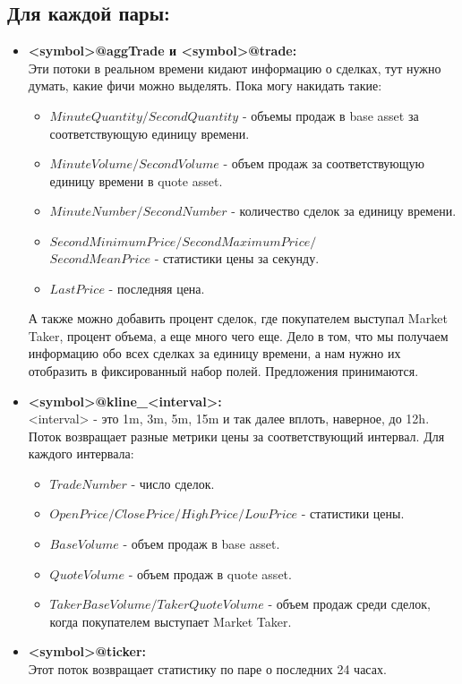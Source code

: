 \documentclass[a4paper,12pt]{article}
\begin{document}
\subsection*{Для каждой пары:}
\begin{itemize}
	\item \textbf{<symbol>@aggTrade и <symbol>@trade:} \\
	Эти потоки в реальном времени кидают информацию о сделках, тут нужно думать, какие фичи можно выделять. Пока могу накидать такие:
	\begin{itemize}
		\item $MinuteQuantity/SecondQuantity$ - объемы продаж в base asset за соответствующую единицу времени.
		\item $MinuteVolume/SecondVolume$ - объем продаж за соответствующую единицу времени в quote asset.
		\item $MinuteNumber/SecondNumber$ - количество сделок за единицу времени.
		\item $SecondMinimumPrice/SecondMaximumPrice/$\\$SecondMeanPrice$ - статистики цены за секунду.
		\item $LastPrice$ - последняя цена.
	\end{itemize}
	А также можно добавить процент сделок, где покупателем выступал Market Taker, процент объема, а еще много чего еще. Дело в том, что мы получаем информацию обо всех сделках за единицу времени, а нам нужно их отобразить в фиксированный набор полей. Предложения принимаются.
	\item \textbf{<symbol>@kline\_<interval>:} \\
	<interval> - это 1m, 3m, 5m, 15m и так далее вплоть, наверное, до 12h. Поток возвращает разные метрики цены за соответствующий интервал. Для каждого интервала:
	\begin{itemize}
		\item $TradeNumber$ - число сделок.
		\item $OpenPrice/ClosePrice/HighPrice/LowPrice$ - статистики цены.
		\item $BaseVolume$ - объем продаж в base asset.
		\item $QuoteVolume$ - объем продаж в quote asset.
		\item $TakerBaseVolume/TakerQuoteVolume$ - объем продаж среди сделок, когда покупателем выступает Market Taker.
	\end{itemize}
	\item \textbf{<symbol>@ticker:}\\
	Этот поток возвращает статистику по паре о последних 24 часах.

\end{itemize}
\end{document}

